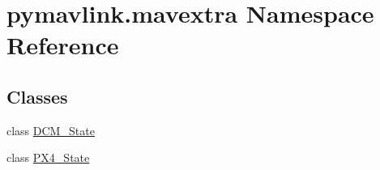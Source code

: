 \hypertarget{namespacepymavlink_1_1mavextra}{}\section{pymavlink.\+mavextra Namespace Reference}
\label{namespacepymavlink_1_1mavextra}
\subsection*{Classes}
\begin{DoxyCompactItemize}
\item 
class \mbox{\hyperlink{classpymavlink_1_1mavextra_1_1DCM__State}{D\+C\+M\+\_\+\+State}}
\item 
class \mbox{\hyperlink{classpymavlink_1_1mavextra_1_1PX4__State}{P\+X4\+\_\+\+State}}
\end{DoxyCompactItemize}
